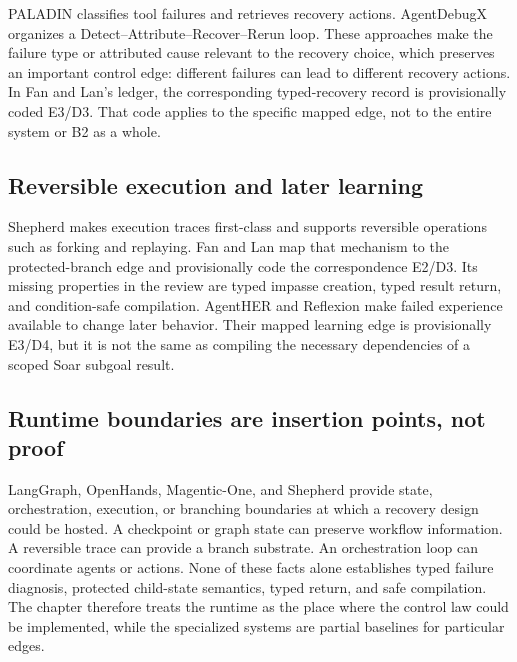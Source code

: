 PALADIN classifies tool failures and retrieves recovery actions. AgentDebugX organizes a Detect--Attribute--Recover--Rerun loop. These approaches make the failure type or attributed cause relevant to the recovery choice, which preserves an important control edge: different failures can lead to different recovery actions. In Fan and Lan's ledger, the corresponding typed-recovery record is provisionally coded E3/D3. That code applies to the specific mapped edge, not to the entire system or B2 as a whole.

\subsection{Reversible execution and later learning}

Shepherd makes execution traces first-class and supports reversible operations such as forking and replaying. Fan and Lan map that mechanism to the protected-branch edge and provisionally code the correspondence E2/D3. Its missing properties in the review are typed impasse creation, typed result return, and condition-safe compilation. AgentHER and Reflexion make failed experience available to change later behavior. Their mapped learning edge is provisionally E3/D4, but it is not the same as compiling the necessary dependencies of a scoped Soar subgoal result.

\subsection{Runtime boundaries are insertion points, not proof}

LangGraph, OpenHands, Magentic-One, and Shepherd provide state, orchestration, execution, or branching boundaries at which a recovery design could be hosted. A checkpoint or graph state can preserve workflow information. A reversible trace can provide a branch substrate. An orchestration loop can coordinate agents or actions. None of these facts alone establishes typed failure diagnosis, protected child-state semantics, typed return, and safe compilation. The chapter therefore treats the runtime as the place where the control law could be implemented, while the specialized systems are partial baselines for particular edges.

